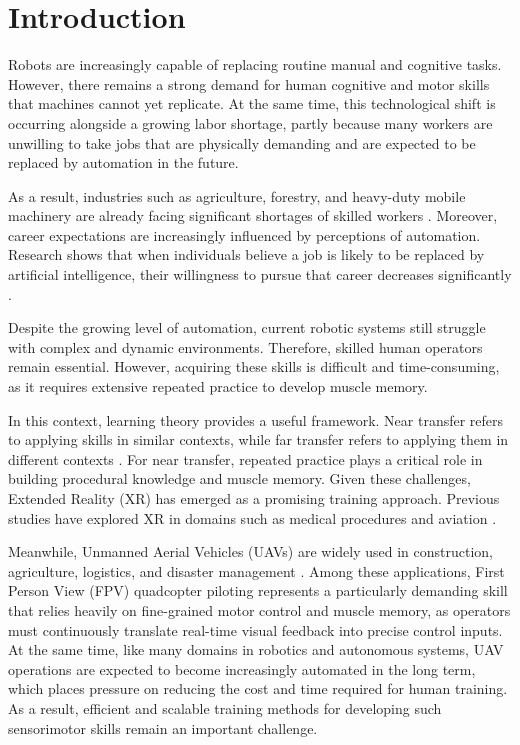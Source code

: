 \section{Introduction}

Robots are increasingly capable of replacing routine manual and cognitive tasks. However, there remains a strong demand for human cognitive and motor skills that machines cannot yet replicate. At the same time, this technological shift is occurring alongside a growing labor shortage, partly because many workers are unwilling to take jobs that are physically demanding and are expected to be replaced by automation in the future.

As a result, industries such as agriculture, forestry, and heavy-duty mobile machinery are already facing significant shortages of skilled workers \parencite{machado_autonomous_2021}. Moreover, career expectations are increasingly influenced by perceptions of automation. Research shows that when individuals believe a job is likely to be replaced by artificial intelligence, their willingness to pursue that career decreases significantly \parencite{wang_influence_2026}.

Despite the growing level of automation, current robotic systems still struggle with complex and dynamic environments. Therefore, skilled human operators remain essential. However, acquiring these skills is difficult and time-consuming, as it requires extensive repeated practice to develop muscle memory.

In this context, learning theory provides a useful framework. Near transfer refers to applying skills in similar contexts, while far transfer refers to applying them in different contexts \parencite{barnett_when_2002}. For near transfer, repeated practice plays a critical role in building procedural knowledge and muscle memory. Given these challenges, Extended Reality (XR) has emerged as a promising training approach. Previous studies have explored XR in domains such as medical procedures and aviation \parencite{dutescu_virtual_2025}. 

Meanwhile, Unmanned Aerial Vehicles (UAVs) are widely used in construction, agriculture, logistics, and disaster management \parencite{otto_optimization_2018}. Among these applications, First Person View (FPV) quadcopter piloting represents a particularly demanding skill that relies heavily on fine-grained motor control and muscle memory, as operators must continuously translate real-time visual feedback into precise control inputs. At the same time, like many domains in robotics and autonomous systems, UAV operations are expected to become increasingly automated in the long term, which places pressure on reducing the cost and time required for human training. As a result, efficient and scalable training methods for developing such sensorimotor skills remain an important challenge.

